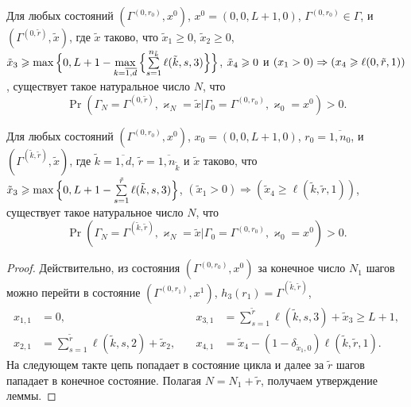 \documentclass[a4paper,12pt,russian]{extarticle}
\begin{document}
\begin{lemma}
Для любых состояний $(\Gamma^{(0,r_0)},x^0)$, $x^0=(0,0,L+1,0)$, $\Gamma^{(0,r_0)} \in \Gamma$, и
$(\Gamma^{(0,\tilde{r})},\tilde{x})$,
где $\tilde{x}$ таково, что $\tilde{x}_1 \geqslant 0$, $\tilde{x}_2\geqslant 0$, $\tilde{x}_3\hm\geqslant \max{}\Bigl\{0,L+1\hm-\max\limits_{k=\overline{1,d}}{\Bigl\{\sum\limits_{s=1}^{n_{\tilde{k}}} \ell(\tilde{k},s,3)\Bigr\}}\Bigr\}$, $\tilde{x}_4\hm\geqslant 0$ и $(x_1 > 0)\hm\Rightarrow (x_4\geqslant \ell(0,\tilde{r},1))$, существует такое натуральное число $N$, что 
\begin{equation*}
\Pr(\Gamma_{N}=\Gamma^{(0,\tilde{r} )}, \varkappa_{N}=\tilde{x}|
\Gamma_{0}=\Gamma^{(0,r_0)}, \varkappa_{0}=x^0)>0.
\end{equation*}
\end{lemma}

\begin{lemma}
Для любых состояний $(\Gamma^{(0,r_0)},x^0)$, $x_0=(0,0,L+1,0)$, $r_0=\overline{1,n_0}$, и
$(\Gamma^{(\tilde{k},\tilde{r})},\tilde{x})$,
где $\tilde{k}=\overline{1,d}$, $\tilde{r} = \overline{1,n_{\tilde{k}}}$ и $\tilde{x}$ таково, что $\tilde{x}_3\geqslant \max{\Bigl\{0,L+1-\sum\limits_{s=1}^{\tilde{r}}\ell(\tilde{k},s,3)\Bigr\}}$,
$(\tilde{x}_1>0) \Rightarrow (\tilde{x}_4\geqslant \ell(\tilde{k},\tilde{r},1))$, существует такое натуральное число $N$, что 
\begin{equation*}
\Pr(\Gamma_{N}=\Gamma^{(\tilde{k},\tilde{r} )}, \varkappa_{N}=\tilde{x}|
\Gamma_{0}=\Gamma^{(0,r_0)}, \varkappa_{0}=x^0)>0.
\end{equation*}
\end{lemma}
\begin{proof}
Действительно, из состояния $(\Gamma^{(0,r_0)},x^0)$ за конечное число $N_1$ шагов можно перейти в состояние $(\Gamma^{(0,r_1)},x^1)$, $h_3(r_1)=\Gamma^{(\tilde{k},\tilde{r})}$,
\begin{align*}
x_{1,1}&=0,& \quad x_{3,1}&=\sum_{s=1}^{\tilde{r}} \ell(\tilde{k},s,3) +\tilde{x}_3\geqslant L+1, \\
x_{2,1}&=\sum_{s=1}^{\tilde{r}} \ell(\tilde{k},s,2) + \tilde{x}_2,& \quad x_{4,1}&=\tilde{x}_4 -  (1- \delta_{\tilde{x}_1,0}) \ell(\tilde{k},\tilde{r},1).
\end{align*}
На следующем такте цепь попадает в состояние цикла и далее за $\tilde{r}$ шагов пападает в конечное состояние. Полагая $N=N_1+\tilde{r}$, получаем утверждение леммы.
\end{proof}
\end{document}
